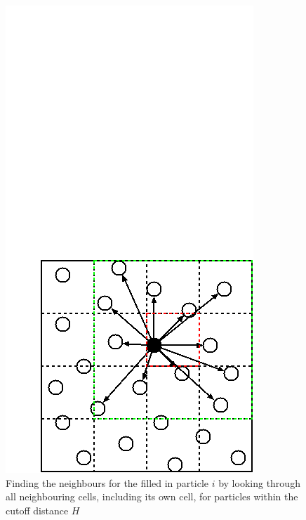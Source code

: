 \documentclass[journal]{vgtc}                %
\begin{document}
    \begin{figure}
    \includegraphics[width=\linewidth]{img/CellLists2.png}
    \caption{Finding the neighbours for the filled in particle $i$ by looking through all neighbouring cells, including its own cell, for particles within the cutoff distance $H$}
    \label{fig:cellList}
    \end{figure}
\end{document}
